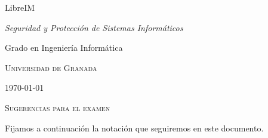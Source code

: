 \documentclass[
  a4paper,
  spanish,
  12pt,
]{scrartcl}
\theoremstyle{ejercicio-style}
\theoremstyle{remark-style}
\theoremstyle{teorema-style}
\begin{document}
\begin{flushright}
  LibreIM\vspace{.5em}

  \textit{Seguridad y Protección de Sistemas Informáticos}

  Grado en Ingeniería Informática

  \textsc{Universidad de Granada}\vspace{.5em}

  \today\vspace{.5em}
\end{flushright}

\begin{flushleft}
  \scshape\Large Sugerencias para el examen
\end{flushleft}

Fijamos a continuación la notación que seguiremos en este documento.
\end{document}
